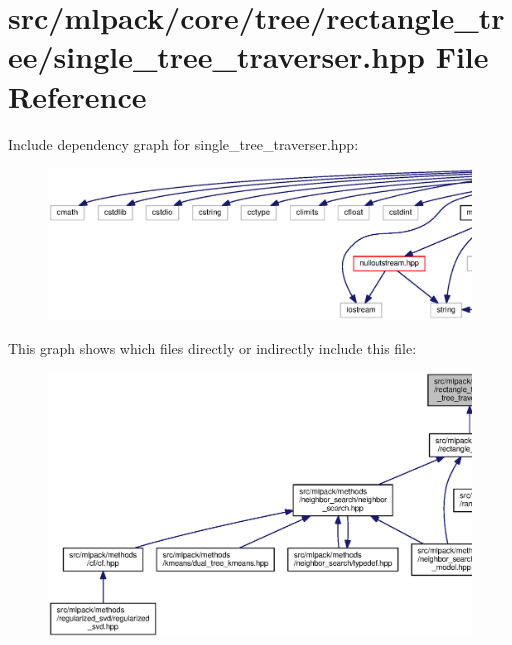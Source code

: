 \section{src/mlpack/core/tree/rectangle\+\_\+tree/single\+\_\+tree\+\_\+traverser.hpp File Reference}
\label{rectangle__tree_2single__tree__traverser_8hpp}
Include dependency graph for single\+\_\+tree\+\_\+traverser.\+hpp\+:
\nopagebreak
\begin{figure}[H]
\begin{center}
\leavevmode
\includegraphics[width=350pt]{rectangle__tree_2single__tree__traverser_8hpp__incl}
\end{center}
\end{figure}
This graph shows which files directly or indirectly include this file\+:
\nopagebreak
\begin{figure}[H]
\begin{center}
\leavevmode
\includegraphics[width=350pt]{rectangle__tree_2single__tree__traverser_8hpp__dep__incl}
\end{center}
\end{figure}
